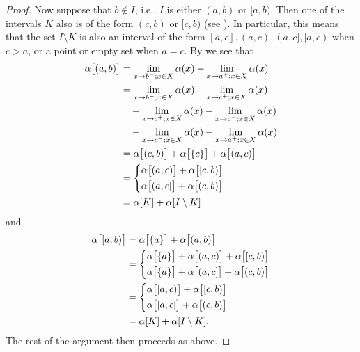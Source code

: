 \begin{proof}
  Now suppose that \(b \notin I\), i.e., \(I\) is either \((a, b)\) or \([a, b)\).
  Then one of the intervals \(K\) also is of the form \((c, b)\) or \([c, b)\) (see ).
      In particular, this means that the set \(I \setminus K\) is also an interval of the form \([a, c], (a, c), (a, c], [a, c)\) when \(c > a\), or a point or empty set when \(a = c\).
  By  we see that
  \begin{align*}
    \alpha\big[(a, b)\big] & = \lim_{x \to b^- ; x \in X} \alpha(x) - \lim_{x \to a^+ ; x \in X} \alpha(x)       \\
                           & = \lim_{x \to b^- ; x \in X} \alpha(x) - \lim_{x \to c^+ ; x \in X} \alpha(x)       \\
                           & \quad + \lim_{x \to c^+ ; x \in X} \alpha(x) - \lim_{x \to c^- ; x \in X} \alpha(x) \\
                           & \quad + \lim_{x \to c^- ; x \in X} \alpha(x) - \lim_{x \to a^+ ; x \in X} \alpha(x) \\
                           & = \alpha\big[(c, b)\big] + \alpha\big[\set{c}\big] + \alpha\big[(a, c)\big]         \\
                           & = \begin{dcases}
                                 \alpha\big[(a, c)\big] + \alpha\big[[c, b)\big] \\
                                   \alpha\big[(a, c]\big] + \alpha\big[(c, b)\big]
                               \end{dcases}      \\
                           & = \alpha[K] + \alpha[I \setminus K]
  \end{align*}
  and
  \begin{align*}
    \alpha\big[[a, b)\big] & = \alpha\big[\set{a}\big] + \alpha\big[(a, b)\big]                                                                        \\
                           & = \begin{dcases}
                                 \alpha\big[\set{a}\big] + \alpha\big[(a, c)\big] + \alpha\big[[c, b)\big] \\
                                   \alpha\big[\set{a}\big] + \alpha\big[(a, c]\big] + \alpha\big[(c, b)\big]
                               \end{dcases} \\
                           & = \begin{dcases}
                                 \alpha\big[[a, c)\big] + \alpha\big[[c, b)\big] \\
                                 \alpha\big[[a, c]\big] + \alpha\big[(c, b)\big]
                               \end{dcases}                                        \\
                           & = \alpha[K] + \alpha[I \setminus K].
  \end{align*}
  The rest of the argument then proceeds as above.
\end{proof}

